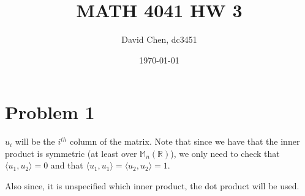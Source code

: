 \documentclass[12pt,letterpaper]{article}
\title{MATH 4041 HW 3}
\author{David Chen, dc3451}
\date{\today}
\theoremstyle{definition}
\newcommand{\R}{\mathbb{R}}
\begin{document}
\maketitle

\section*{Problem 1}

$u_i$ will be the $i^{th}$ column of the matrix. Note that since we have that the inner product is symmetric (at least over $\mathbb{M}_n(\R)$), we only need to check that $\langle u_1, u_2 \rangle = 0$ and that $\langle u_1, u_1 \rangle = \langle u_2, u_2 \rangle = 1$.

Also since, it is unspecified which inner product, the dot product will be used.
\end{document}
